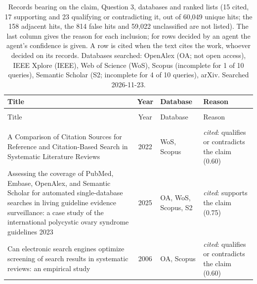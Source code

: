 
\begingroup\footnotesize
\begin{longtable}{@{}%
  >{\raggedright\arraybackslash}p{}c%
  >{\raggedright\arraybackslash}p{}%
  >{\raggedright\arraybackslash}p{}@{}}
\caption{Records bearing on the claim, Question 3, databases and ranked lists (15 cited, 17 supporting and 23 qualifying or contradicting it, out of 60,049 unique hits; the 158 adjacent hits, the 814 false hits and 59,022 unclassified are not listed). The last column gives the reason for each inclusion; for rows decided by an agent the agent's confidence is given. A row is cited when the text cites the work, whoever decided on its records. Databases searched: OpenAlex (OA; not open access), IEEE Xplore (IEEE), Web of Science (WoS), Scopus (incomplete for 1 of 10 queries), Semantic Scholar (S2; incomplete for 4 of 10 queries), arXiv. Searched 2026-11-23.}\label{tab:screenlit-q3}\\
\toprule
Title & Year & Database & Reason \\
\midrule
\endfirsthead
\multicolumn{4}{@{}l}{\emph{\tablename~\thetable{} (cont.)}}\\
\toprule
Title & Year & Database & Reason \\
\midrule
\endhead
\midrule \multicolumn{4}{r@{}}{\emph{continued on next page}}\\
\endfoot
\bottomrule
\endlastfoot
A Comparison of Citation Sources for Reference and Citation-Based Search in Systematic Literature Reviews & 2022 & WoS, Scopus & \emph{cited}: qualifies or contradicts the claim (0.60) \\
Assessing the coverage of PubMed, Embase, OpenAlex, and Semantic Scholar for automated single-database searches in living guideline evidence surveillance: a case study of the international polycystic ovary syndrome guidelines 2023 & 2025 & OA, WoS, Scopus, S2 & \emph{cited}: supports the claim (0.75) \\
Can electronic search engines optimize screening of search results in systematic reviews: an empirical study & 2006 & OA, Scopus & \emph{cited}: qualifies or contradicts the claim (0.60) \\

\end{longtable}
